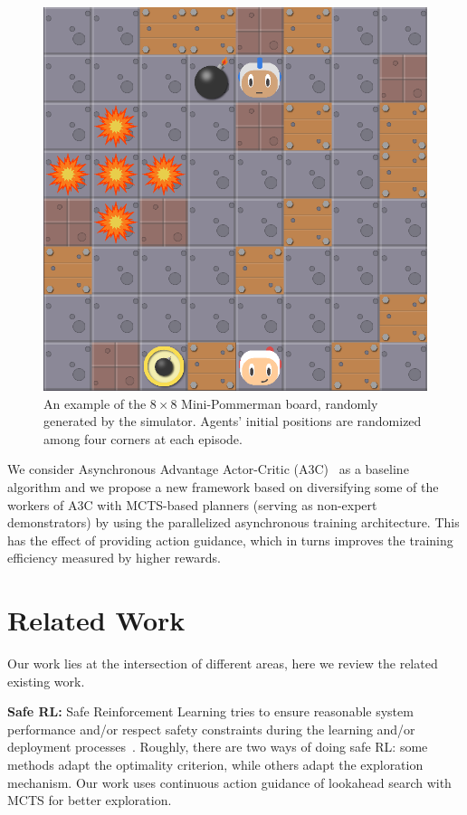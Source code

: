 \documentclass[letterpaper]{article}
\begin{document}
\begin{figure}
\centering
\includegraphics[scale=0.26]{pom8x8.png}
\caption{An example of the $8 \times 8$ Mini-Pommerman board, randomly generated by the simulator. Agents' initial positions are randomized among four corners at each episode.}
\label{fig:pom8x8}
\end{figure}

We consider Asynchronous Advantage Actor-Critic (A3C)~\cite{mnih2016asynchronous} as a baseline algorithm and we propose a new framework based on diversifying some of the workers of A3C with MCTS-based planners (serving as non-expert demonstrators) by using the parallelized asynchronous training architecture. This has the effect of providing action guidance, which in turns improves the training efficiency measured by higher rewards.

\section{Related Work}

Our work lies at the intersection of different areas, here we review the related existing work.

\textbf{Safe RL:} Safe Reinforcement Learning tries to ensure reasonable system performance and/or respect safety constraints during the learning and/or deployment processes~\cite{garcia2015comprehensive}. Roughly, there are two ways of doing safe RL: some methods adapt the optimality criterion, while others adapt the exploration mechanism. Our work uses continuous action guidance of lookahead search with MCTS for better exploration.
\end{document}

